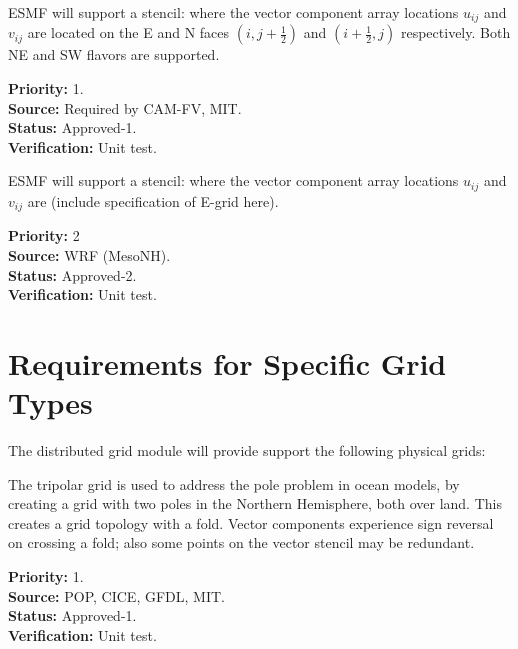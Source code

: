 \sreq{\dgrid}

ESMF will support a \dgrid stencil: where the vector component array
locations $u_{ij}$ and $v_{ij}$ are located on the E and N faces
$(i,j+\frac12)$ and $(i+\frac12,j)$ respectively. Both NE and SW
flavors are supported.

\begin{reqlist}
{\bf Priority:} 1. \\ 
{\bf Source:} Required by CAM-FV, MIT. \\
{\bf Status:} Approved-1. \\
{\bf Verification:} Unit test.
\end{reqlist}

\sreq{\egrid}

ESMF will support a \egrid stencil: where the vector component array
locations $u_{ij}$ and $v_{ij}$ are (include specification of E-grid here).

\begin{reqlist}
{\bf Priority:} 2\\ 
{\bf Source:} WRF (MesoNH). \\
{\bf Status:} Approved-2. \\
{\bf Verification:} Unit test.
\end{reqlist}

\part{Requirements for Specific Grid Types} \label{DG:gridtypes}

The distributed grid module will provide support the following 
physical grids:


The tripolar grid \cite{ref:m1996} is used to address the pole problem
in ocean models, by creating a grid with two poles in the Northern
Hemisphere, both over land. This creates a grid topology with a
fold. Vector components experience sign reversal on crossing a fold;
also some points on the vector stencil may be redundant.

\begin{reqlist}
{\bf Priority:} 1. \\ 
{\bf Source:} POP, CICE, GFDL, MIT. \\
{\bf Status:} Approved-1. \\
{\bf Verification:} Unit test. 
\end{reqlist}


